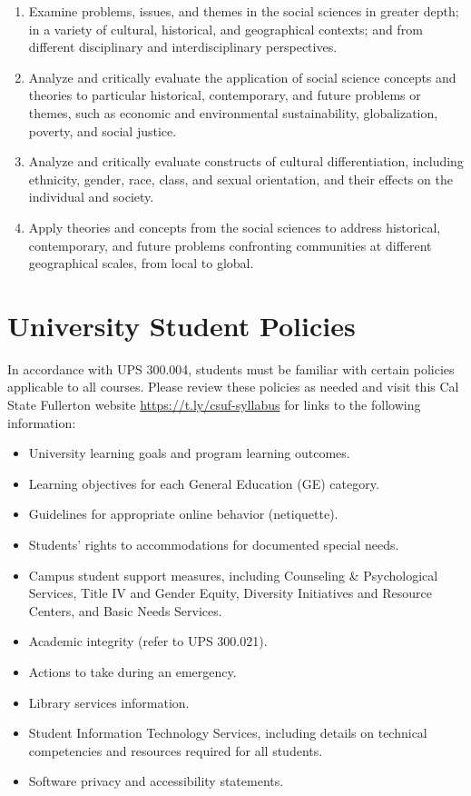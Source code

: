 \documentclass[12pt, letterpaper]{article}
\begin{document}
\begin{enumerate}
	\item Examine problems, issues, and themes in the social sciences in greater depth; in a variety of cultural, historical, and geographical contexts; and from different disciplinary and interdisciplinary perspectives.
	\item Analyze and critically evaluate the application of social science concepts and theories to particular historical, contemporary, and future problems or themes, such as economic and environmental sustainability, globalization, poverty, and social justice.
	\item Analyze and critically evaluate constructs of cultural differentiation, including ethnicity, gender, race, class, and sexual orientation, and their effects on the individual and society.
	\item Apply theories and concepts from the social sciences to address historical, contemporary, and future problems confronting communities at different geographical scales, from local to global.
\end{enumerate}


\section*{University Student Policies}

In accordance with UPS 300.004, students must be familiar with certain policies applicable to all courses. Please review these policies as needed and visit this Cal State Fullerton website \href{https://t.ly/csuf-syllabus}{https://t.ly/csuf-syllabus} for links to the following information:

\begin{itemize}
    \item   University learning goals and program learning outcomes.
    \item	Learning objectives for each General Education (GE) category.
    \item	Guidelines for appropriate online behavior (netiquette).
    \item	Students’ rights to accommodations for documented special needs.
    \item   Campus student support measures, including Counseling \& Psychological Services, Title IV and Gender Equity, Diversity Initiatives and Resource Centers, and Basic Needs Services.
    \item	Academic integrity (refer to UPS 300.021).
    \item	Actions to take during an emergency.
    \item	Library services information.
    \item	Student Information Technology Services, including details on technical competencies and resources required for all students.
    \item	Software privacy and accessibility statements.
\end{itemize}
\end{document}
